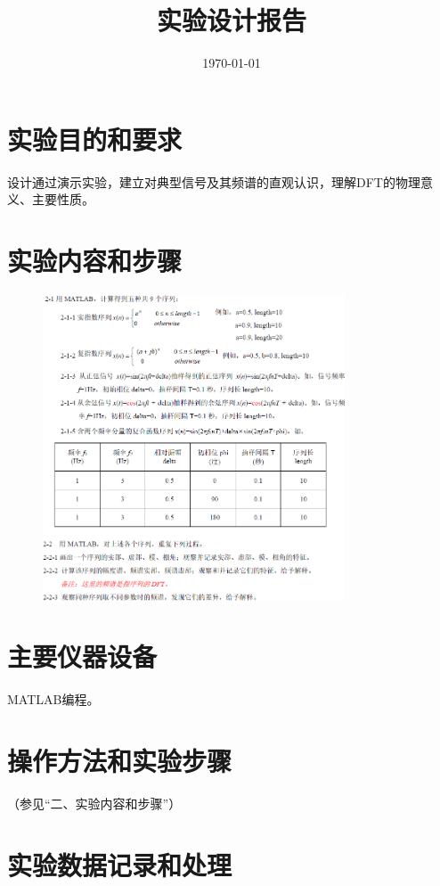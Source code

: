 \documentclass{../source/zjureport}
\title{实验设计报告}
\date{\today}
\begin{document}
    \makeheader
    \section{实验目的和要求}
    设计通过演示实验，建立对典型信号及其频谱的直观认识，理解DFT的物理意义、主要性质。

    \section{实验内容和步骤}
        \begin{figure}[H]
            \centering
            \includegraphics[width = 0.8\textwidth]{figure/page1.png}
        \end{figure}
         
    
    \section{主要仪器设备}
    MATLAB编程。
    \section{操作方法和实验步骤}
    （参见“二、实验内容和步骤”）
    \section{实验数据记录和处理}
        
        \newpage
        
        
        
        
        
        
        
\end{document}
